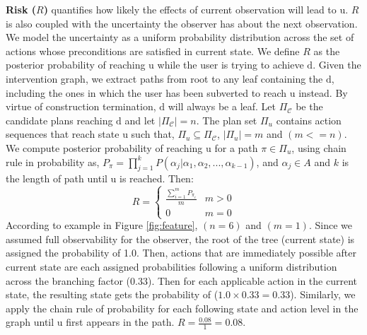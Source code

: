 \documentclass[letterpaper]{article}
\theoremstyle{plain}
\begin{document}
\textbf{Risk ($R$)} quantifies how likely the effects of current observation will lead to $\mathrm{u}$. $R$ is also coupled with the uncertainty the observer has about the next observation. We model the uncertainty as a uniform probability distribution across the set of actions whose preconditions are satisfied in current state. We define $R$ as the posterior probability of reaching $\mathrm{u}$ while the user is trying to achieve $\mathrm{d}$. Given the intervention graph, we extract paths from root to any leaf containing the $\mathrm{d}$, including the ones in which the user has been subverted to reach $\mathrm{u}$ instead. By virtue of construction termination, $\mathrm{d}$ will always be a leaf.
Let $\Pi_{\mathcal{C}}$ be the candidate plans reaching $\mathrm{d}$ and let $\left | \Pi_{\mathcal{C}} \right |=n$. The plan set $\Pi_{u}$ contains action sequences that reach state $\mathrm{u}$ such that, $\Pi_{u} \subseteq \Pi_{\mathcal{C}}$, $\left | \Pi_{u} \right |=m$ and $(m<=n)$. We compute posterior probability of reaching $\mathrm{u}$ for a path $\pi \in \Pi_{u}$, using chain rule in probability as, $P_{\pi}=\prod_{j=1}^{k}P(\alpha_j|\alpha_1, \alpha_2,...,\alpha_{k-1})$, and $\alpha_{j} \in A$ and $k$ is the length of path until $\mathrm{u}$ is reached. Then: 
\begin{equation*} 
R = \left\{\begin{matrix} \frac{\sum_{i=1}^{m}P_{\pi_i}}{m} & m>0\\ 0 &  m=0 \end{matrix}\right.
\end{equation*}
According to example in Figure \ref{fig:feature}, $(n=6)$ and $(m=1)$. Since we assumed full observability for the observer, the root of the tree (current state) is assigned the probability of 1.0. Then, actions that are immediately possible after current state are each assigned probabilities following a uniform distribution across the branching factor (0.33). Then for each applicable action in the current state, the resulting state gets the probability of ($1.0\times0.33=0.33$). Similarly, we apply the chain rule of probability for each following state and action level in the graph until $\mathrm{u}$ first appears in the path. $R=\frac{0.08}{1}=0.08$.
\end{document}
